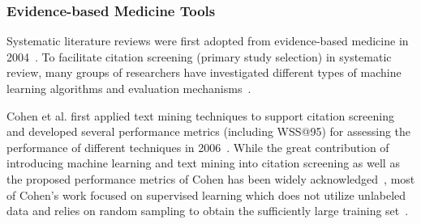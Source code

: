 \documentclass{svjour3}
\theoremstyle{break}
\begin{document}


\subsubsection{Evidence-based Medicine Tools}
\label{sect: Evidence-based Medicine}

Systematic literature reviews were first adopted from evidence-based medicine in
2004~\cite{kitchenham2004evidence}. To facilitate citation screening (primary
study selection) in systematic review, many groups of researchers have investigated different types of machine learning algorithms and evaluation mechanisms~\cite{o2015using,paynter2016epc}. 

Cohen et al. first applied text mining techniques to support citation screening and developed several performance metrics (including WSS@95) for assessing the performance of different techniques in 2006~\cite{cohen2006reducing}. While the great contribution of introducing machine learning and text mining into citation screening as well as the proposed performance metrics of Cohen has been widely acknowledged~\cite{o2015using}, most of Cohen's work focused on supervised learning which does not utilize unlabeled data and relies on random sampling to obtain the sufficiently large training set~\cite{cohen2006reducing,cohen2006effective,cohen2010prospective,cohen2011performance}.
\end{document}
